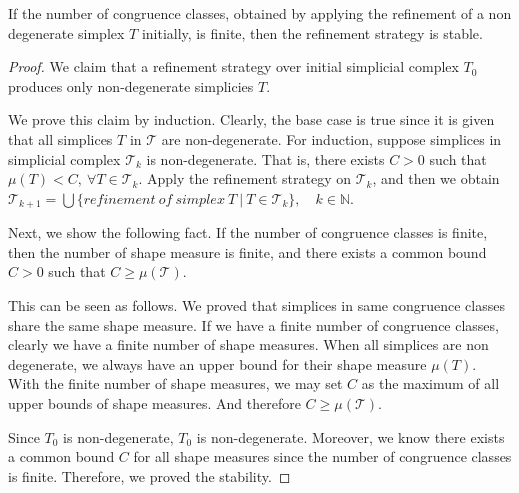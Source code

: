     \begin{theorem*}
    If the number of congruence classes, obtained by applying the refinement of a non degenerate simplex $T$ initially, is finite, then the refinement strategy is stable.
    \end{theorem*}
    \begin{proof}
    
    We claim that
    a refinement strategy over initial simplicial complex $T_0$ produces only non-degenerate simplicies $T$.
    
    We prove this claim by induction.
    Clearly, the base case is true since it is given that all simplices $T$ in $\mathcal{T}$ are non-degenerate. For induction, suppose simplices in simplicial complex $\mathcal{T}_k$ is non-degenerate. That is, there exists $C > 0$ such that $\mu(T) < C, ~\forall T \in\mathcal{T}_k$. Apply the refinement strategy on $\mathcal{T}_k$, and then we obtain $\mathcal{T}_{k+1} = \bigcup\{refinement~of~simplex~T ~\vert ~T\in\mathcal{T}_{k}\}, \quad k\in\mathbb{N}$. 
    
    Next, we show the following fact.
    If the number of congruence classes is finite, then the number of shape measure is finite, and there exists a common bound $C > 0$ such that $C \geq \mu(\mathcal{T})$.
    
    This can be seen as follows.
    We proved that simplices in same congruence classes share the same shape measure. If we have a finite number of congruence classes, clearly we have a finite number of shape measures. When all simplices are non degenerate, we always have an upper bound for their shape measure $\mu(T)$. With the finite number of shape measures, we may set $C$ as the maximum of all upper bounds of shape measures. And therefore $C \geq \mu(\mathcal{T})$.
    
    Since $T_0$ is non-degenerate, $T_0$ is non-degenerate. Moreover, we know there exists a common bound $C$ for all shape measures since the number of congruence classes is finite. Therefore, we proved the stability.
    \end{proof}
    
    